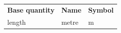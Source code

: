 {\begin{center}
      \label{m30853*uid2}
      
    \noindent
      \tablelasttail{}
      \begin{xtabular*}{\mytablewidth}[t]{|p{10\mystarwidth}|p{10\mystarwidth}|p{10\mystarwidth}|}\hline
    
    
        
                  \textbf{Base quantity}
                 &
    
    
        
                  \textbf{Name}
                 &
    
    
        
                  \textbf{Symbol}
     \tabularnewline{}
    
    
        length &
    
    
        metre &
    
    
        m%
     \tabularnewline{}
    

\end{xtabular*}
\end{center}}
